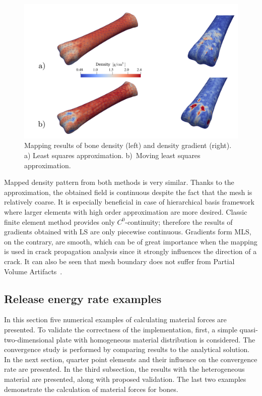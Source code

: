 \documentclass[11pt]{acmeArticle}
\numberwithin{equation}{section}
\begin{document}
\begin{figure}
	\centering
	\includegraphics[width=0.7\linewidth]{Figures/mwls_mapping_comparisons.png}
	\caption{Mapping results of bone density (left) and density gradient (right). a) Least squares approximation. b)~Moving least squares approximation.}
	\label{fig:mwlsmappingcomparisons}
\end{figure}
Mapped density pattern from both methods is very similar. 
Thanks to the approximation, the obtained field is continuous despite the fact that the mesh is relatively coarse. 
It is especially beneficial in case of hierarchical basis framework where larger elements with high order approximation are more desired. 
Classic finite element method provides only ${C^0}$-continuity; therefore the results of gradients obtained with LS are only piecewise continuous. 
Gradients form MLS, on the contrary, are smooth, which can be of great importance when the mapping is used in crack propagation analysis since it strongly influences the direction of a crack. 
It can also be seen that mesh boundary does not suffer from Partial Volume Artifacts~\citep{adams2009quantitative}.
\subsection{Release energy rate examples}
\label{sec:release_energy_rate}
In this section five numerical examples of calculating material forces are presented. 
To validate the correctness of the implementation, first, a simple quasi-two-dimensional plate with homogeneous material distribution is considered. 
The convergence study is performed by comparing results to the analytical solution. 
In the next section, quarter point elements and their influence on the convergence rate are presented. 
In the third subsection, the results with the heterogeneous material are presented, along with proposed validation. 
The last two examples demonstrate the calculation of material forces for bones.  
\end{document}
